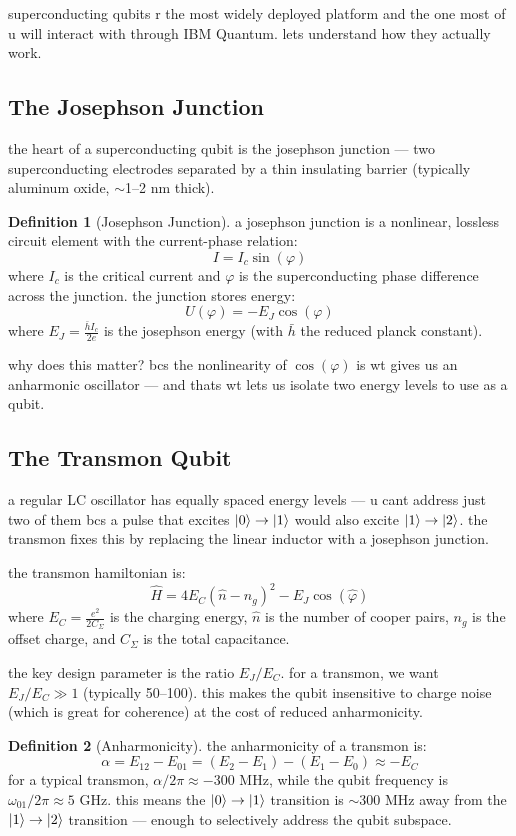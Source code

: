 \documentclass[11pt,a4paper]{article}
\theoremstyle{definition}
\newtheorem{definition}{Definition}[section]
\theoremstyle{remark}
\begin{document}
superconducting qubits r the most widely deployed platform and the one most of u will interact with through IBM Quantum. lets understand how they actually work.

\subsection{The Josephson Junction}

the heart of a superconducting qubit is the josephson junction --- two superconducting electrodes separated by a thin insulating barrier (typically aluminum oxide, $\sim$1--2 nm thick).

\begin{definition}[Josephson Junction]
a josephson junction is a nonlinear, lossless circuit element with the current-phase relation:
\[
I = I_c \sin(\varphi)
\]
where $I_c$ is the critical current and $\varphi$ is the superconducting phase difference across the junction. the junction stores energy:
\[
U(\varphi) = -E_J \cos(\varphi)
\]
where $E_J = \frac{\bar{h} I_c}{2e}$ is the josephson energy (with $\bar{h}$ the reduced planck constant).
\end{definition}

why does this matter? bcs the nonlinearity of $\cos(\varphi)$ is wt gives us an anharmonic oscillator --- and thats wt lets us isolate two energy levels to use as a qubit.

\subsection{The Transmon Qubit}

a regular LC oscillator has equally spaced energy levels --- u cant address just two of them bcs a pulse that excites $\ket{0} \to \ket{1}$ would also excite $\ket{1} \to \ket{2}$. the transmon fixes this by replacing the linear inductor with a josephson junction.

the transmon hamiltonian is:
\[
\hat{H} = 4E_C(\hat{n} - n_g)^2 - E_J \cos(\hat{\varphi})
\]
where $E_C = \frac{e^2}{2C_\Sigma}$ is the charging energy, $\hat{n}$ is the number of cooper pairs, $n_g$ is the offset charge, and $C_\Sigma$ is the total capacitance.

the key design parameter is the ratio $E_J / E_C$. for a transmon, we want $E_J / E_C \gg 1$ (typically 50--100). this makes the qubit insensitive to charge noise (which is great for coherence) at the cost of reduced anharmonicity.

\begin{definition}[Anharmonicity]
the anharmonicity of a transmon is:
\[
\alpha = E_{12} - E_{01} = (E_2 - E_1) - (E_1 - E_0) \approx -E_C
\]
for a typical transmon, $\alpha / 2\pi \approx -300$ MHz, while the qubit frequency is $\omega_{01}/2\pi \approx 5$ GHz. this means the $\ket{0} \to \ket{1}$ transition is $\sim$300 MHz away from the $\ket{1} \to \ket{2}$ transition --- enough to selectively address the qubit subspace.
\end{definition}
\end{document}
